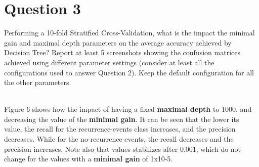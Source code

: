 \section{Question 3}

\begin{question}
    Performing a 10-fold Stratified Cross-Validation, what is the impact the minimal gain and maximal
    depth parameters on the average accuracy achieved by Decision Tree? Report at least 5 screenshots
    showing the confusion matrices achieved using different parameter settings (consider at least all
    the configurations used to answer Question 2). Keep the default configuration for all the other
    parameters.
\end{question}

\begin{answer}
    \\
    Figure 6 shows how the impact of having a fixed \textbf{maximal depth} to 1000, and decreasing
    the value of the \textbf{minimal gain}. It can be seen that the lower its value, the recall for the
    recurrence-events class increases, and the precision decreases. While for the no-recurrence-events,
    the recall decreases and the precision increases. Note also that values stabilizes after 0.001,
    which do not change for the values with a \textbf{minimal gain} of 1x10-5.
    \\
    \\


\end{answer}
